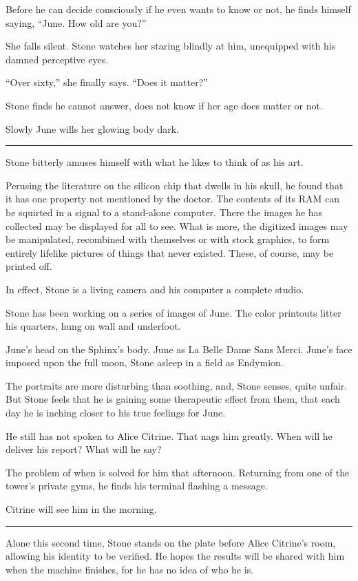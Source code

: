 Before he can decide consciously if he even wants to know or not, he finds himself saying, ``June. How old are you?''

She falls silent. Stone watches her staring blindly at him, unequipped with his damned perceptive eyes.

``Over sixty,'' she finally says. ``Does it matter?''

Stone finds he cannot answer, does not know if her age does matter or not.

Slowly June wills her glowing body dark.

\fancybreak{* * *}

Stone bitterly amuses himself with what he likes to think of as his art.

Perusing the literature on the silicon chip that dwells in his skull, he found that it has one property not mentioned by the doctor. The contents of its RAM can be squirted in a signal to a stand-alone computer. There the images he has collected may be displayed for all to see. What is more, the digitized images may be manipulated, recombined with themselves or with stock graphics, to form entirely lifelike pictures of things that never existed. These, of course, may be printed off.

In effect, Stone is a living camera and his computer a complete studio.

Stone has been working on a series of images of June. The color printouts litter his quarters, hung on wall and underfoot.

June's head on the Sphinx's body. June as La Belle Dame Sans Merci. June's face imposed upon the full moon, Stone asleep in a field as Endymion.

The portraits are more disturbing than soothing, and, Stone senses, quite unfair. But Stone feels that he is gaining some therapeutic effect from them, that each day he is inching closer to his true feelings for June.

He still has not spoken to Alice Citrine. That nags him greatly. When will he deliver his report? What will he say?

The problem of when is solved for him that afternoon. Returning from one of the tower's private gyms, he finds his terminal flashing a message.

Citrine will see him in the morning.

\fancybreak{* * *}

Alone this second time, Stone stands on the plate before Alice Citrine's room, allowing his identity to be verified. He hopes the results will be shared with him when the machine finishes, for he has no idea of who he is.

